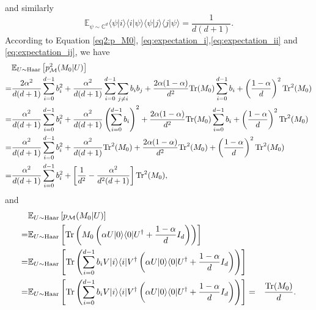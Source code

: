     and similarly
    \begin{equation} \label{eq:expectation_ij}
        \mathbb{E}_{\psi \sim \mathbb{C}^d} \langle \psi | i \rangle \langle i |\psi \rangle\langle \psi | j \rangle \langle j |\psi \rangle= \frac{1}{d(d+1)}.
    \end{equation}
    According to Equation \eqref{eq2:p_M0}, \eqref{eq:expectation_i},\eqref{eq:expectation_ii} and \eqref{eq:expectation_ij}, we have 
    \begin{equation}
        \begin{aligned} \label{eq3:p_M0}
            &\mathbb{E}_{U \sim \mathrm{Haar}}\left[ p^2_{\mathcal{M}}(M_0| U)\right] \\
            = & \frac{2\alpha^2}{d(d+1)} \sum_{i=0}^{d-1} b^2_i   + \frac{\alpha^2}{d(d+1)}\sum_{i=0}^{d-1}\sum_{j \neq i}b_ib_j  + \frac{2\alpha(1-\alpha)}{d^2}\mathrm{Tr}(M_0) \sum_{i=0}^{d-1} b_i + \left(\frac{1-\alpha}{d}\right)^2\mathrm{Tr}^2(M_0)  \\
            = & \frac{\alpha^2}{d(d+1)} \sum_{i=0}^{d-1} b^2_i   + \frac{\alpha^2}{d(d+1)}\left(\sum_{i=0}^{d-1}b_i\right)^2  + \frac{2\alpha(1-\alpha)}{d^2}\mathrm{Tr}(M_0) \sum_{i=0}^{d-1} b_i + \left(\frac{1-\alpha}{d}\right)^2\mathrm{Tr}^2(M_0) \\
            = & \frac{\alpha^2}{d(d+1)} \sum_{i=0}^{d-1} b^2_i   + \frac{\alpha^2}{d(d+1)}\mathrm{Tr}^2(M_0)  + \frac{2\alpha(1-\alpha)}{d^2}\mathrm{Tr}^2(M_0) + \left(\frac{1-\alpha}{d}\right)^2\mathrm{Tr}^2(M_0) \\
             = & \frac{\alpha^2}{d(d+1)} \sum_{i=0}^{d-1} b^2_i   + \left[\frac{1}{d^2} - \frac{\alpha^2}{d^2(d+1)}\right]\mathrm{Tr}^2(M_0), \\
        \end{aligned}
    \end{equation}
    and
    \begin{equation}
        \begin{aligned}
            &\mathbb{E}_{U \sim \mathrm{Haar}}\left[ p_{\mathcal{M}}(M_0| U)\right] \\
            = & \mathbb{E}_{U \sim \mathrm{Haar}}\left[\mathrm{Tr}\left(M_0 \left( \alpha U | 0 \rangle \langle 0 | U^\dagger + \frac{1-\alpha}{d} I_d\right)\right)\right] \\
            = & \mathbb{E}_{U \sim \mathrm{Haar}}\left[\mathrm{Tr}\left(\sum_{i=0}^{d-1} b_i V |i \rangle \langle i | V^\dagger \left( \alpha U | 0 \rangle \langle 0 | U^\dagger + \frac{1-\alpha}{d} I_d\right)\right)\right] \\
            = & \mathbb{E}_{U \sim \mathrm{Haar}}\left[\mathrm{Tr}\left(\sum_{i=0}^{d-1} b_i V |i \rangle \langle i | V^\dagger \left( \alpha U | 0 \rangle \langle 0 | U^\dagger + \frac{1-\alpha}{d} I_d\right)\right)\right]
            = & \frac{\mathrm{Tr}(M_0)}{d}.
        \end{aligned}
    \end{equation}

